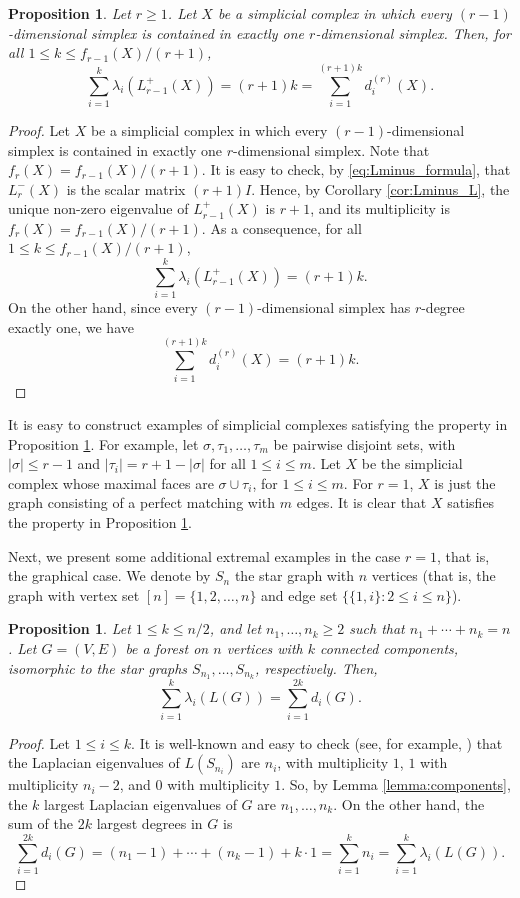 \documentclass[a4paper,11pt]{article}
\theoremstyle{plain}
\newtheorem{proposition}[theorem]{\bf Proposition}
\theoremstyle{definition}
\numberwithin{theorem}{section}
\numberwithin{equation}{section}
\begin{document}
\begin{proposition}\label{prop:extremal}
    Let $r\ge 1$.  Let $X$ be a simplicial complex in which every $(r-1)$-dimensional simplex is contained in exactly one $r$-dimensional simplex. Then, for all $1\le k\le f_{r-1}(X)/(r+1)$,
    \[
        \sum_{i=1}^k \lambda_i(L_{r-1}^+(X)) = (r+1)k = \sum_{i=1}^{(r+1)k} d_i^{(r)}(X).
    \]
\end{proposition}
\begin{proof}
    Let $X$ be a simplicial complex in which every $(r-1)$-dimensional simplex is contained in exactly one $r$-dimensional simplex. Note that $f_{r}(X) = f_{r-1}(X)/(r+1)$. 
It is easy to check, by \eqref{eq:Lminus_formula}, that $L^-_r(X)$ is the scalar matrix $(r+1)I$. 
  Hence, by Corollary \ref{cor:Lminus_L}, the unique non-zero eigenvalue of $L_{r-1}^+(X)$ is $r+1$, and its multiplicity is $f_r(X)=f_{r-1}(X)/(r+1)$. As a consequence, for all $1\le k\le f_{r-1}(X)/(r+1)$,
    \[
        \sum_{i=1}^k \lambda_i(L_{r-1}^+(X)) = (r+1)k.
    \]
    On the other hand, since every $(r-1)$-dimensional simplex has $r$-degree exactly one, we have
    \[
        \sum_{i=1}^{(r+1)k} d_i^{(r)}(X) = (r+1)k.
    \]
\end{proof}

It is easy to construct examples of simplicial complexes satisfying the property in Proposition \ref{prop:extremal}. For example, let $\sigma,\tau_1,\ldots,\tau_m$ be pairwise disjoint sets, with $|\sigma|\le r-1$ and $|\tau_i|=r+1-|\sigma|$ for all $1\le i\le m$.  Let $X$ be the simplicial complex whose maximal faces are $\sigma\cup\tau_i$, for $1\le i\le m$. 
For $r=1$, $X$ is just the graph consisting of a perfect matching with $m$ edges. It is clear that $X$ satisfies the property in Proposition \ref{prop:extremal}.

Next, we present some additional extremal examples in the case $r=1$, that is, the graphical case.
We denote by $S_n$ the star graph with $n$ vertices (that is, the graph with vertex set $[n]=\{1,2,\ldots,n\}$ and edge set $\{\{1,i\}: 2\le i\le n\}$).

\begin{proposition}
    Let $1\le k \le n/2$, and let $n_1,\ldots,n_k\ge 2$ such that $n_1+\cdots+n_k=n$. 
    Let $G=(V,E)$ be a forest on $n$ vertices with $k$ connected components, isomorphic to the star graphs $S_{n_1},\ldots,S_{n_k}$, respectively. Then,
    \[
        \sum_{i=1}^k \lambda_i(L(G))= \sum_{i=1}^{2k} d_i(G).
    \]
\end{proposition}
\begin{proof}
    Let $1\le i\le k$. It is well-known and easy to check (see, for example, \cite[Lemma 2]{haemers2010onthesum}) that the Laplacian eigenvalues of $L(S_{n_i})$ are $n_i$, with multiplicity $1$, $1$ with multiplicity $n_i-2$, and $0$ with multiplicity $1$. So, by Lemma \ref{lemma:components}, the $k$ largest Laplacian eigenvalues of $G$ are $n_1,\ldots,n_k$. On the other hand, the sum of the $2k$ largest degrees in $G$ is
    \[
        \sum_{i=1}^{2k}d_i(G)= (n_1-1)+\cdots+(n_k-1)+k\cdot 1= \sum_{i=1}^k n_i = \sum_{i=1}^k \lambda_i(L(G)).
    \]
\end{proof}
\end{document}
